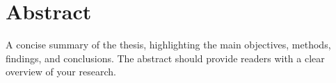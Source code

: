 \section{Abstract}

A concise summary of the thesis, highlighting the main objectives, methods, findings, and conclusions. The abstract should provide readers with a clear overview of your research.\\